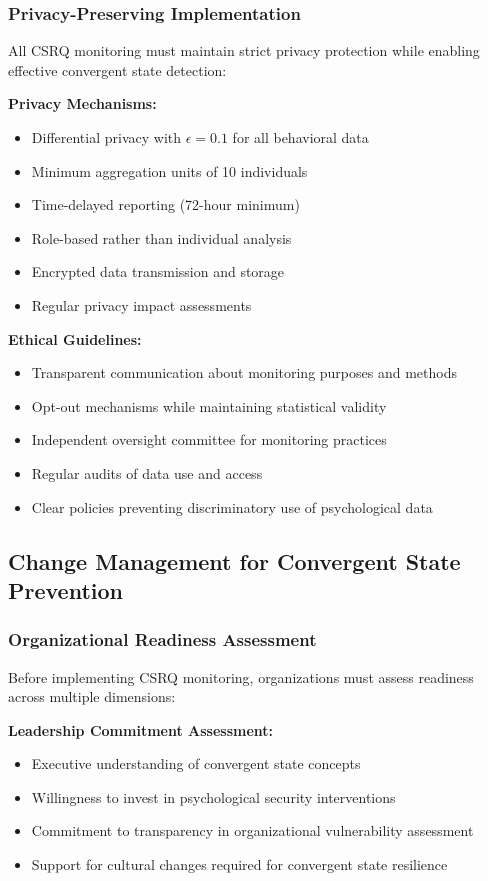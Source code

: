 \documentclass[11pt,a4paper]{article}
\begin{document}
\subsubsection{Privacy-Preserving Implementation}

All CSRQ monitoring must maintain strict privacy protection while enabling effective convergent state detection:

\textbf{Privacy Mechanisms:}
\begin{itemize}
\item Differential privacy with $\epsilon = 0.1$ for all behavioral data
\item Minimum aggregation units of 10 individuals
\item Time-delayed reporting (72-hour minimum)
\item Role-based rather than individual analysis
\item Encrypted data transmission and storage
\item Regular privacy impact assessments
\end{itemize}

\textbf{Ethical Guidelines:}
\begin{itemize}
\item Transparent communication about monitoring purposes and methods
\item Opt-out mechanisms while maintaining statistical validity
\item Independent oversight committee for monitoring practices
\item Regular audits of data use and access
\item Clear policies preventing discriminatory use of psychological data
\end{itemize}

\subsection{Change Management for Convergent State Prevention}

\subsubsection{Organizational Readiness Assessment}

Before implementing CSRQ monitoring, organizations must assess readiness across multiple dimensions:

\textbf{Leadership Commitment Assessment:}
\begin{itemize}
\item Executive understanding of convergent state concepts
\item Willingness to invest in psychological security interventions
\item Commitment to transparency in organizational vulnerability assessment
\item Support for cultural changes required for convergent state resilience
\end{itemize}
\end{document}
